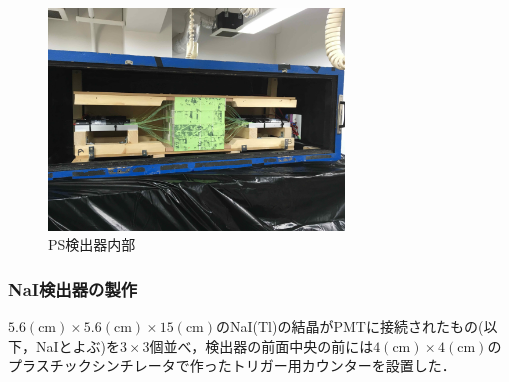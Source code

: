 \begin{figure}[H]
  \centering
  \includegraphics[width=0.7\textwidth]{figure/hayakawa/PS_in.jpg}
  \caption{PS検出器内部}
\end{figure}




\subsubsection{NaI検出器の製作}
$5.6(\mathrm{cm})\times 5.6(\mathrm{cm})\times 15(\mathrm{cm})$のNaI(Tl)の結晶がPMTに接続されたもの(以下，NaIとよぶ)を$3\times 3$個並べ，検出器の前面中央の前には$4(\mathrm{cm})\times 4(\mathrm{cm})$のプラスチックシンチレータで作ったトリガー用カウンターを設置した．

